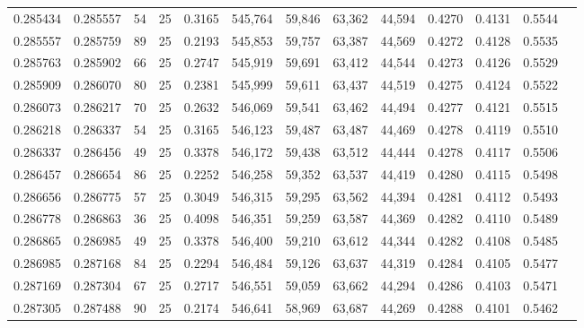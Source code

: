 \begin{tabular}{rrrrrrrrrrrrr}
0.285434 & 0.285557 &    54 &  25 &                                     0.3165 & 545,764 &  59,846 &  63,362 &  44,594 & 0.4270 & 0.4131 & 0.5544 \\
0.285557 & 0.285759 &    89 &  25 &                                     0.2193 & 545,853 &  59,757 &  63,387 &  44,569 & 0.4272 & 0.4128 & 0.5535 \\
0.285763 & 0.285902 &    66 &  25 &                                     0.2747 & 545,919 &  59,691 &  63,412 &  44,544 & 0.4273 & 0.4126 & 0.5529 \\
0.285909 & 0.286070 &    80 &  25 &                                     0.2381 & 545,999 &  59,611 &  63,437 &  44,519 & 0.4275 & 0.4124 & 0.5522 \\
0.286073 & 0.286217 &    70 &  25 &                                     0.2632 & 546,069 &  59,541 &  63,462 &  44,494 & 0.4277 & 0.4121 & 0.5515 \\
0.286218 & 0.286337 &    54 &  25 &                                     0.3165 & 546,123 &  59,487 &  63,487 &  44,469 & 0.4278 & 0.4119 & 0.5510 \\
0.286337 & 0.286456 &    49 &  25 &                                     0.3378 & 546,172 &  59,438 &  63,512 &  44,444 & 0.4278 & 0.4117 & 0.5506 \\
0.286457 & 0.286654 &    86 &  25 &                                     0.2252 & 546,258 &  59,352 &  63,537 &  44,419 & 0.4280 & 0.4115 & 0.5498 \\
0.286656 & 0.286775 &    57 &  25 &                                     0.3049 & 546,315 &  59,295 &  63,562 &  44,394 & 0.4281 & 0.4112 & 0.5493 \\
0.286778 & 0.286863 &    36 &  25 &                                     0.4098 & 546,351 &  59,259 &  63,587 &  44,369 & 0.4282 & 0.4110 & 0.5489 \\
0.286865 & 0.286985 &    49 &  25 &                                     0.3378 & 546,400 &  59,210 &  63,612 &  44,344 & 0.4282 & 0.4108 & 0.5485 \\
0.286985 & 0.287168 &    84 &  25 &                                     0.2294 & 546,484 &  59,126 &  63,637 &  44,319 & 0.4284 & 0.4105 & 0.5477 \\
0.287169 & 0.287304 &    67 &  25 &                                     0.2717 & 546,551 &  59,059 &  63,662 &  44,294 & 0.4286 & 0.4103 & 0.5471 \\
0.287305 & 0.287488 &    90 &  25 &                                     0.2174 & 546,641 &  58,969 &  63,687 &  44,269 & 0.4288 & 0.4101 & 0.5462 \\

\end{tabular}
